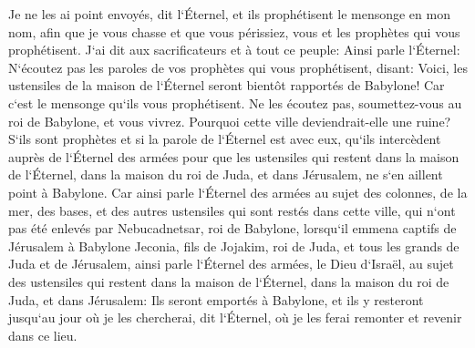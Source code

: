 \verse Je ne les ai point envoyés, dit l`Éternel, et ils prophétisent le mensonge en mon nom, afin que je vous chasse et que vous périssiez, vous et les prophètes qui vous prophétisent. 
\verse J`ai dit aux sacrificateurs et à tout ce peuple: Ainsi parle l`Éternel: N`écoutez pas les paroles de vos prophètes qui vous prophétisent, disant: Voici, les ustensiles de la maison de l`Éternel seront bientôt rapportés de Babylone! Car c`est le mensonge qu`ils vous prophétisent. 
\verse Ne les écoutez pas, soumettez-vous au roi de Babylone, et vous vivrez. Pourquoi cette ville deviendrait-elle une ruine? 
\verse S`ils sont prophètes et si la parole de l`Éternel est avec eux, qu`ils intercèdent auprès de l`Éternel des armées pour que les ustensiles qui restent dans la maison de l`Éternel, dans la maison du roi de Juda, et dans Jérusalem, ne s`en aillent point à Babylone. 
\verse Car ainsi parle l`Éternel des armées au sujet des colonnes, de la mer, des bases, et des autres ustensiles qui sont restés dans cette ville, 
\verse qui n`ont pas été enlevés par Nebucadnetsar, roi de Babylone, lorsqu`il emmena captifs de Jérusalem à Babylone Jeconia, fils de Jojakim, roi de Juda, et tous les grands de Juda et de Jérusalem, 
\verse ainsi parle l`Éternel des armées, le Dieu d`Israël, au sujet des ustensiles qui restent dans la maison de l`Éternel, dans la maison du roi de Juda, et dans Jérusalem: 
\verse Ils seront emportés à Babylone, et ils y resteront jusqu`au jour où je les chercherai, dit l`Éternel, où je les ferai remonter et revenir dans ce lieu. 

